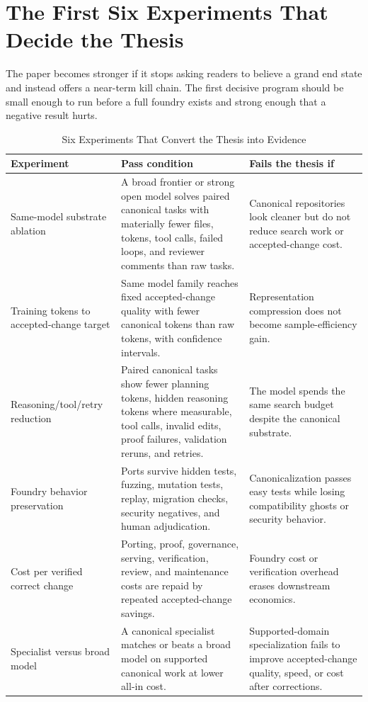 \section{The First Six Experiments That Decide the Thesis}
\label{sec:first-six-experiments}

The paper becomes stronger if it stops asking readers to believe a grand end state and instead offers a near-term kill chain. The first decisive program should be small enough to run before a full foundry exists and strong enough that a negative result hurts.

\begin{table}[t]
\caption{Six Experiments That Convert the Thesis into Evidence}
\label{tab:first-six-experiments}
\centering
\footnotesize
\renewcommand{\arraystretch}{1.14}
\begin{tabularx}{\textwidth}{p{}X X}
\toprule
Experiment & Pass condition & Fails the thesis if \\
\midrule
Same-model substrate ablation & A broad frontier or strong open model solves paired canonical tasks with materially fewer files, tokens, tool calls, failed loops, and reviewer comments than raw tasks. & Canonical repositories look cleaner but do not reduce search work or accepted-change cost. \\
Training tokens to accepted-change target & Same model family reaches fixed accepted-change quality with fewer canonical tokens than raw tokens, with confidence intervals. & Representation compression does not become sample-efficiency gain. \\
Reasoning/tool/retry reduction & Paired canonical tasks show fewer planning tokens, hidden reasoning tokens where measurable, tool calls, invalid edits, proof failures, validation reruns, and retries. & The model spends the same search budget despite the canonical substrate. \\
Foundry behavior preservation & Ports survive hidden tests, fuzzing, mutation tests, replay, migration checks, security negatives, and human adjudication. & Canonicalization passes easy tests while losing compatibility ghosts or security behavior. \\
Cost per verified correct change & Porting, proof, governance, serving, verification, review, and maintenance costs are repaid by repeated accepted-change savings. & Foundry cost or verification overhead erases downstream economics. \\
Specialist versus broad model & A canonical specialist matches or beats a broad model on supported canonical work at lower all-in cost. & Supported-domain specialization fails to improve accepted-change quality, speed, or cost after corrections. \\
\bottomrule
\end{tabularx}
\end{table}

